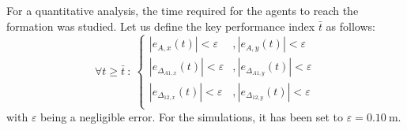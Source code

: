 \documentclass{ifacconf}
\begin{document}
For a quantitative analysis, the time required for the agents to reach 
the formation was studied.
Let us define the key performance index $\bar{t}$ as follows:
\begin{equation}
    \forall t \geq \bar{t}\ : \
    \left\{\begin{aligned}
        \left\lvert {e}_{A,x}(t) \right\rvert < \varepsilon &, \left\lvert {e}_{A,y}(t) \right\rvert < \varepsilon \\
        \left\lvert e_{\Delta_{A1,x}}(t) \right\rvert < \varepsilon &, \left\lvert e_{\Delta_{A1,y}}(t)\right\rvert < \varepsilon \\
        \left\lvert e_{\Delta_{12,x}}(t) \right\rvert < \varepsilon &, \left\lvert e_{\Delta_{12,y}}(t) \right\rvert < \varepsilon \\
    \end{aligned} \right.
\end{equation}
with $\varepsilon$ being a negligible error. For the simulations, it has been set to
$\varepsilon = \SI{0.10}{\meter}$.
\end{document}
